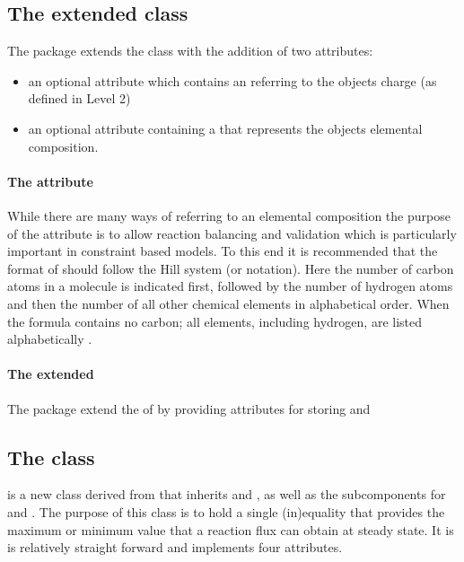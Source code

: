 \subsection{The extended  class}
\label{sbml-species}
\label{species-class}

The \FBC package extends the \SBML \Species class with the addition of two attributes:
\begin{itemize}
  \item an optional attribute  which contains an  referring to the \Species objects charge (as defined in \SBML Level 2)
  \item an optional attribute  containing a  that represents the \Species objects elemental composition.
\end{itemize}

\paragraph{The  attribute}
\label{chemicalFormula-attribute}
While there are many ways of referring to an elemental composition the purpose of the  attribute is to allow reaction balancing and validation which is particularly important in constraint based models. To this end it is recommended that the format of  should follow the Hill system (or notation). Here the number of carbon atoms in a molecule is indicated first, followed by the number of hydrogen atoms and then the number of all other chemical elements in alphabetical order. When the formula contains no carbon; all elements, including hydrogen, are listed alphabetically \cite{hillsystem, hillwikipedia}.


\paragraph{The extended \Species}
The \FBC package extend the \SBML \Species of \sbmlthreecore by providing attributes for storing  and 
%

\subsection{The \FBC {} class}
\label{fluxbound-class}

\FluxBound is a new \FBC class derived from \SBML \SBase that inherits  and , as well as the subcomponents for \Annotation and \Notes. The purpose of this class is to hold a single (in)equality that provides the maximum or minimum value that a reaction flux can obtain at steady state. It is is relatively straight forward and implements four attributes.

